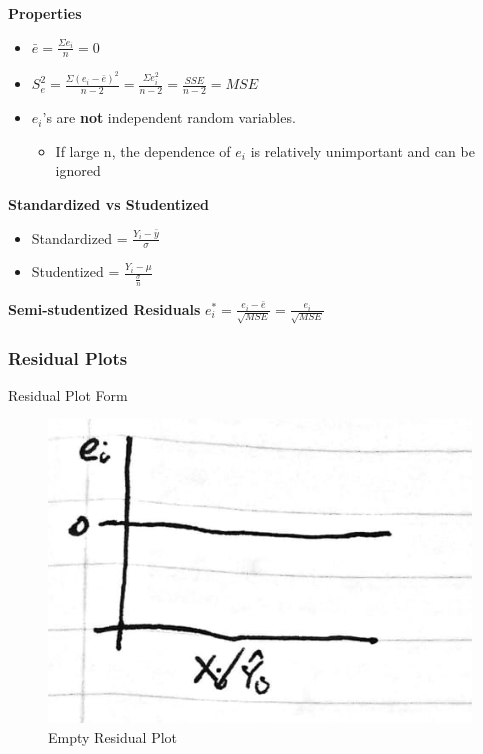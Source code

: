 \documentclass[11pt]{article}
\begin{document}
\textbf{Properties}
\begin{itemize}
\item \(\bar{e} = \frac{\Sigma e_i}{n} = 0\)
\item \(S^2_e = \frac{\Sigma (e_i - \bar{e})^2}{n - 2} = \frac{\Sigma e_i^2}{n - 2} =
  \frac{SSE}{n - 2} = MSE\)
\item \(e_i\)'s are \textbf{not} independent random variables.
\begin{itemize}
\item If large n, the dependence of \(e_i\) is relatively unimportant and can be
ignored
\end{itemize}
\end{itemize}

\textbf{Standardized vs Studentized}
\begin{itemize}
\item Standardized = \(\frac{Y_i - \bar{y}}{\sigma}\)
\item Studentized = \(\frac{Y_i - \mu}{\frac{\sigma}{n}}\)
\end{itemize}

\textbf{Semi-studentized Residuals}
\(e_i^* =\frac{e_i - \bar{e}}{\sqrt{MSE}} =\frac{e_i}{\sqrt{MSE}}\)

\subsubsection{Residual Plots}
\label{sec:org5bb57ae}

Residual Plot Form

\begin{figure}[htbp]
\centering
\includegraphics[width=.9\linewidth]{./images/empty_res-1.jpg}
\caption{\label{fig:org115bce6}
Empty Residual Plot}
\end{figure}
\end{document}
